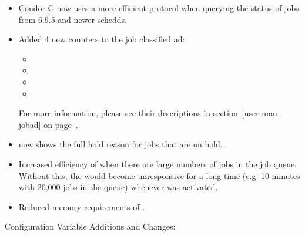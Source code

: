 \begin{itemize}

\item Condor-C now uses a more efficient protocol when querying the
status of jobs from 6.9.5 and newer schedds.

\item Added 4 new counters to the job classified ad:
 \begin{itemize}
 \item {}
 \item {}
 \item {}
 \item {}
 \end{itemize}
For more information, please see their descriptions in
section~\ref{user-man-jobad} on page~\pageref{user-man-jobad}.

\item {}  now shows the full hold reason for jobs
that are on hold.

\item Increased efficiency of  when there are large
numbers of jobs in the job queue.  Without this, the 
would become unresponsive for a long time (e.g. 10 minutes with 20,000
jobs in the queue) whenever  was activated.

\item Reduced memory requirements of .

\end{itemize}

\noindent Configuration Variable Additions and Changes:

